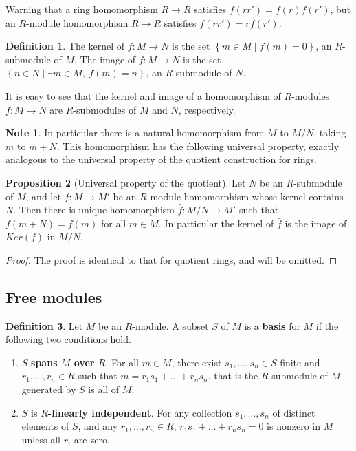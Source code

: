 \documentclass{article}
\newcommand{\rb}[1]{\left( #1 \right)}
\newcommand{\cb}[1]{\left\{ #1 \right\}}
\theoremstyle{definition}\newtheorem{definition}{Definition}[subsection]
\theoremstyle{definition}\newtheorem{remark}[definition]{Remark}
\theoremstyle{definition}\newtheorem*{example}{Example}
\theoremstyle{definition}\newtheorem*{note}{Note}
\newtheorem{proposition}[definition]{Proposition}
\begin{document}
Warning that a ring homomorphism $ R \to R $ satisfies $ f\rb{rr'} = f\rb{r}f\rb{r'} $, but an $ R $-module homomorphism $ R \to R $ satisfies $ f\rb{rr'} = rf\rb{r'} $.

\begin{definition}
The kernel of $ f : M \to N $ is the set $ \cb{m \in M \mid f\rb{m} = 0} $, an $ R $-submodule of $ M $. The image of $ f : M \to N $ is the set $ \cb{n \in N \mid \exists m \in M, \ f\rb{m} = n} $, an $ R $-submodule of $ N $.
\end{definition}

It is easy to see that the kernel and image of a homomorphism of $ R $-modules $ f : M \to N $ are $ R $-submodules of $ M $ and $ N $, respectively.

\begin{note}
In particular there is a natural homomorphism from $ M $ to $ M / N $, taking $ m $ to $ m + N $. This homomorphism has the following universal property, exactly analogous to the universal property of the quotient construction for rings.
\end{note}

\begin{proposition}[Universal property of the quotient]
Let $ N $ be an $ R $-submodule of $ M $, and let $ f : M \to M' $ be an $ R $-module homomorphism whose kernel contains $ N $. Then there is unique homomorphism $ \bar{f} : M / N \to M' $ such that $ f\rb{m + N} = f\rb{m} $ for all $ m \in M $. In particular the kernel of $ \bar{f} $ is the image of $ Ker\rb{f} $ in $ M / N $.
\end{proposition}

\begin{proof}
The proof is identical to that for quotient rings, and will be omitted.
\end{proof}

\subsection{Free modules}

\begin{definition}
Let $ M $ be an $ R $-module. A subset $ S $ of $ M $ is a \textbf{basis} for $ M $ if the following two conditions hold.
\begin{enumerate}
\item $ S $ \textbf{spans $ M $ over $ R $}. For all $ m \in M $, there exist $ s_1, \dots, s_n \in S $ finite and $ r_1, \dots, r_n \in R $ such that $ m = r_1s_1 + \dots + r_ns_n $, that is the $ R $-submodule of $ M $ generated by $ S $ is all of $ M $.
\item $ S $ is \textbf{$ R $-linearly independent}. For any collection $ s_1, \dots, s_n $ of distinct elements of $ S $, and any $ r_1, \dots, r_n \in R $, $ r_1s_1 + \dots + r_ns_n = 0 $ is nonzero in $ M $ unless all $ r_i $ are zero.
\end{enumerate}
\end{definition}
\end{document}
